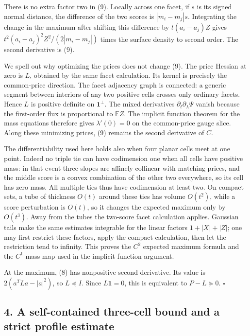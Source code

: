 \documentclass[
  11pt,
]{article}
\begin{document}
There is no extra factor two in (9). Locally across one facet, if \(s\)
is its signed normal distance, the difference of the two scores is
\(|m_i-m_j|s\). Integrating the change in the maximum after shifting
this difference by \(t(a_i-a_j)Z\) gives
\(t^2(a_i-a_j)^2Z^2/(2|m_i-m_j|)\) times the surface density to second
order. The second derivative is (9).

We spell out why optimizing the prices does not change (9). The price
Hessian at zero is \(L\), obtained by the same facet calculation. Its
kernel is precisely the common-price direction. The facet adjacency
graph is connected: a generic segment between interiors of any two
positive cells crosses only ordinary facets. Hence \(L\) is positive
definite on \(\mathbf1^\perp\). The mixed derivatives
\(\partial_t\partial_\lambda\Psi\) vanish because the first-order flux
is proportional to \(\mathbb EZ\). The implicit function theorem for the
mass equations therefore gives \(\lambda'(0)=0\) on the common-price
gauge slice. Along these minimizing prices, (9) remains the second
derivative of \(C\).

The differentiability used here holds also when four planar cells meet
at one point. Indeed no triple tie can have codimension one when all
cells have positive mass: in that event three slopes are affinely
collinear with matching prices, and the middle score is a convex
combination of the other two everywhere, so its cell has zero mass. All
multiple ties thus have codimension at least two. On compact sets, a
tube of thickness \(O(t)\) around these ties has volume \(O(t^2)\),
while a score perturbation is \(O(t)\), so it changes the expected
maximum only by \(O(t^3)\). Away from the tubes the two-score facet
calculation applies. Gaussian tails make the same estimates integrable
for the linear factors \(1+|X|+|Z|\); one may first restrict these
factors, apply the compact calculation, then let the restriction tend to
infinity. This proves the \(C^2\) expected maximum formula and the
\(C^1\) mass map used in the implicit function argument.

At the maximum, (8) has nonpositive second derivative. Its value is
\(2(a^TLa-|a|^2)\), so \(L\preceq I\). Since \(L\mathbf1=0\), this is
equivalent to \(P-L\succeq0\). \(\square\)

\subsection{4. A self-contained three-cell bound and a strict profile
estimate}\label{a-self-contained-three-cell-bound-and-a-strict-profile-estimate}
\end{document}
